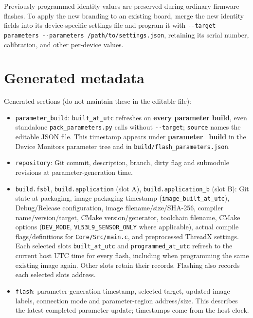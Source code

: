 \documentclass[10pt,a4paper,oneside]{report}
\providecommand{\tightlist}{\setlength{\itemsep}{1pt}\setlength{\parskip}{1pt}}
\begin{document}
Previously programmed identity values are preserved during ordinary firmware flashes. To apply the new branding to an existing board, merge the new identity fields into its device-specific settings file and program it with \texttt{-\allowbreak{}-\allowbreak{}target parameters -\allowbreak{}-\allowbreak{}parameters /\allowbreak{}path/\allowbreak{}to/\allowbreak{}settings.\allowbreak{}json}, retaining its serial number, calibration, and other per-device values.

\section{Generated metadata}\label{wiki-firmware-parameters--generated-metadata}

Generated sections (do not maintain these in the editable file):

\begin{itemize}
\tightlist
\item
  \texttt{parameter\_\allowbreak{}build}: \texttt{built\_\allowbreak{}at\_\allowbreak{}utc} refreshes on \textbf{every parameter build}, even standalone \texttt{pack\_\allowbreak{}parameters.\allowbreak{}py} calls without \texttt{-\allowbreak{}-\allowbreak{}target}; \texttt{source} names the editable JSON file. This timestamp appears under \textbf{parameter\_build} in the Device Monitor\textquotesingle s parameter tree and in \texttt{build/\allowbreak{}flash\_\allowbreak{}parameters.\allowbreak{}json}.
\item
  \texttt{repository}: Git commit, description, branch, dirty flag and submodule revisions at parameter-generation time.
\item
  \texttt{build.\allowbreak{}fsbl}, \texttt{build.\allowbreak{}application} (slot A), \texttt{build.\allowbreak{}application\_\allowbreak{}b} (slot B): Git state at packaging, image packaging timestamp (\texttt{image\_\allowbreak{}built\_\allowbreak{}at\_\allowbreak{}utc}), Debug/Release configuration, image filename/size/SHA-256, compiler name/version/target, CMake version/generator, toolchain filename, CMake options (\texttt{DEV\_\allowbreak{}MODE}, \texttt{VL53L9\_\allowbreak{}SENSOR\_\allowbreak{}ONLY} where applicable), actual compile flags/definitions for \texttt{Core/\allowbreak{}Src/\allowbreak{}main.\allowbreak{}c}, and preprocessed ThreadX settings. Each selected slot\textquotesingle s \texttt{built\_\allowbreak{}at\_\allowbreak{}utc} and \texttt{programmed\_\allowbreak{}at\_\allowbreak{}utc} refresh to the current host UTC time for every flash, including when programming the same existing image again. Other slots retain their records. Flashing also records each selected slot\textquotesingle s address.
\item
  \texttt{flash}: parameter-generation timestamp, selected target, updated image labels, connection mode and parameter-region address/size. This describes the latest completed parameter update; timestamps come from the host clock.
\end{itemize}
\end{document}
